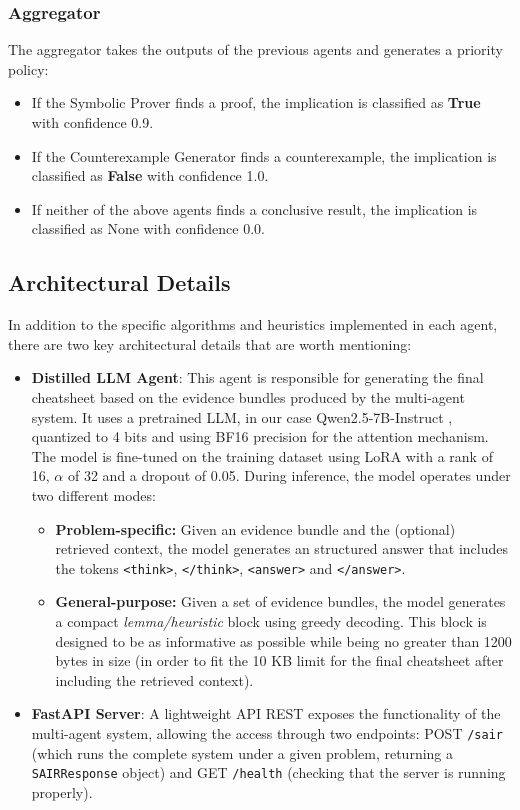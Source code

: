 \documentclass{article}
\begin{document}
\subsubsection{Aggregator}

The aggregator takes the outputs of the previous agents and generates a priority policy:
\begin{itemize}
  \item If the Symbolic Prover finds a proof, the implication is classified as \textbf{True} with confidence 0.9.
  \item If the Counterexample Generator finds a counterexample, the implication is classified as \textbf{False} with confidence 1.0.
  \item If neither of the above agents finds a conclusive result, the implication is classified as None with confidence 0.0.
\end{itemize}

\subsection{Architectural Details}

In addition to the specific algorithms and heuristics implemented in each agent, there are two key architectural details that are worth mentioning:

\begin{itemize}
  \item \textbf{Distilled LLM Agent}: This agent is responsible for generating the final cheatsheet based on the evidence bundles produced by the multi-agent system. It uses a pretrained LLM, in our case Qwen2.5-7B-Instruct \cite{qwen25_7b}, quantized to 4 bits and using BF16 precision for the attention mechanism. The model is fine-tuned on the training dataset using LoRA \cite{hu2021lora} with a rank of 16, $\alpha$ of 32 and a dropout of 0.05. During inference, the model operates under two different modes:
        \begin{itemize}
          \item \textbf{Problem-specific:} Given an evidence bundle and the (optional) retrieved context, the model generates an structured answer that includes the tokens \texttt{<think>}, \texttt{</think>}, \texttt{<answer>} and \texttt{</answer>}.
          \item \textbf{General-purpose:} Given a set of evidence bundles, the model generates a compact \textit{lemma/heuristic} block using greedy decoding. This block is designed to be as informative as possible while being no greater than 1200 bytes in size (in order to fit the 10 KB limit for the final cheatsheet after including the retrieved context).
        \end{itemize}
  \item \textbf{FastAPI Server}: A lightweight API REST exposes the functionality of the multi-agent system, allowing the access through two endpoints: POST \texttt{/sair} (which runs the complete system under a given problem, returning a \texttt{SAIRResponse} object) and GET \texttt{/health} (checking that the server is running properly).
\end{itemize}
\end{document}
